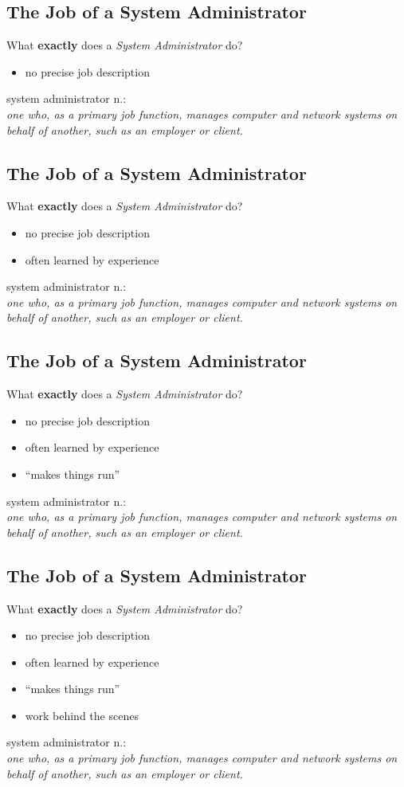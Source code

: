 \documentclass[xga]{xdvislides}
\begin{document}
\subsection{The Job of a System Administrator}
What {\bf exactly} does a {\em System Administrator} do?
\begin{itemize}
	\item no precise job description
\end{itemize}
\vfill
 system administrator n.: \\
{\em one who, as a primary job function,
	manages computer and network systems on behalf of another, such as an
	employer or client.}

\subsection{The Job of a System Administrator}
What {\bf exactly} does a {\em System Administrator} do?
\begin{itemize}
	\item no precise job description
	\item often learned by experience
\end{itemize}
\vfill
system administrator n.: \\
{\em one who, as a primary job function,
	manages computer and network systems on behalf of another, such as an
	employer or client.}

\subsection{The Job of a System Administrator}
What {\bf exactly} does a {\em System Administrator} do?
\begin{itemize}
	\item no precise job description
	\item often learned by experience
	\item ``makes things run''
\end{itemize}
\vfill
system administrator n.: \\
{\em one who, as a primary job function,
	manages computer and network systems on behalf of another, such as an
	employer or client.}

\subsection{The Job of a System Administrator}
What {\bf exactly} does a {\em System Administrator} do?
\begin{itemize}
	\item no precise job description
	\item often learned by experience
	\item ``makes things run''
	\item work behind the scenes
\end{itemize}
\vfill
system administrator n.: \\
{\em one who, as a primary job function,
	manages computer and network systems on behalf of another, such as an
	employer or client.}
\end{document}
